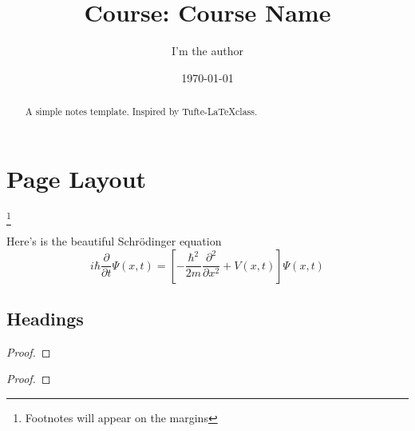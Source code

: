 \documentclass{tufte-handout}
\title{\centering Course:  Course Name}
\author{I'm the author}
\date{\today} %
\begin{document}
\maketitle%

\begin{abstract}
\noindent
A simple notes template. Inspired by Tufte-\LaTeX class.
\end{abstract}



\section{Page Layout}\label{sec:page-layout}

\lipsum[1][1-8]\footnote[1]{Footnotes will appear on the margins}

\begin{definition}%
	Here's is the beautiful Schr\"odinger equation
	\[ i\hbar {\frac {\partial }{\partial t}}\Psi (x,t)=
	\left[-{\frac {\hbar ^{2}}{2m}}{\frac {\partial ^{2}}{\partial x^{2}}}+V(x,t)\right]\Psi (x,t)\]
\end{definition}

\subsection{Headings}\label{sec:headings}


\begin{theorem}%
	\lipsum[1][1-3] %
\end{theorem}

\begin{lemma}%
	\lipsum[1][1-3] %
	
\end{lemma}
\begin{proof}
	\lipsum[1][1-5]
\end{proof}


\begin{corollary}%
	\lipsum[1][1-3] %
\end{corollary}

\begin{proposition}
	\lipsum[1][1-3] %
\end{proposition}
\begin{problem}
	\lipsum[1][1-2]
\end{problem}

\begin{proof}
	\lipsum*[1]
\end{proof}
\end{document}
